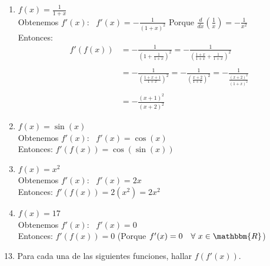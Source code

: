 \documentclass[12pt]{article}
\begin{document}
\begin{enumerate}[\hspace{9px} a)]
    \item \(f(x)=\displaystyle\frac{1}{1+x}\)\\

        Obtenemos $f'(x)$: \ \(f'(x)=\displaystyle-\frac{1}{(1+x)^2}\) \qquad Porque \quad \(\displaystyle\frac{d}{dx}\left(\frac{1}{x}\right)=-\frac{1}{x^2}\)\\

        Entonces:
        \begin{align*}
            f'(f(x))&=\displaystyle-\frac{1}{\left(1+\displaystyle\frac{1}{1+x}\right)^2} = -\frac{1}{\left(\displaystyle\frac{1+x}{1+x}+\frac{1}{1+x}\right)^2} \\ \\
            &= -\frac{1}{\left(\displaystyle\frac{1+x+1}{1+x}\right)^2} = -\frac{1}{\left(\displaystyle\frac{x+2}{1+x}\right)^2} = -\frac{1}{\displaystyle\frac{(x+2)^2}{(1+x)^2}}\\ \\
            &= -\displaystyle\frac{(x+1)^2}{(x+2)^2}
        \end{align*}

    \item \(f(x)=\sin(x)\)\\

        Obtenemos $f'(x)$: \ \(f'(x)=\cos(x)\)\\

        Entonces: \quad \(f'(f(x))=\cos(\sin(x))\)

    \item \(f(x)=x^2\)\\

        Obtenemos $f'(x)$: \ \(f'(x)=2x\)\\

        Entonces: \quad \(f'(f(x))=2(x^2)=2x^2\)

    \item \(f(x)=17\)\\

        Obtenemos $f'(x)$: \ \(f'(x)=0\)\\

        Entonces: \quad \(f'(f(x))=0\) \qquad (Porque \(f'(x)=0 \quad \forall \ x \in \mathbbm{R}\))\\

\end{enumerate}

13. Para cada una de las siguientes funciones, hallar $f(f'(x))$.
\end{document}
